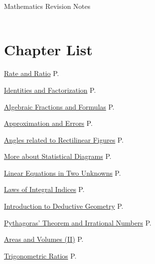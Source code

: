 \documentclass[12pt, a4paper]{article}
\begin{document}
\newpage
\newpage
\thispagestyle{empty}
\begin{center}
Mathematics Revision Notes\\\vspace{1cm}
\greybox{\fontsize{24pt}{24pt}\selectfont {S2 Chapters}} \\\vspace{1cm}
\end{center}
\vspace{0.5cm}
\hline
\section*{Chapter List}
\begin{enumx}[label=Ch \arabic*. , leftmargin=2cm,rightmargin=0pt,labelwidth=17mm, itemsep=3pt, topsep=3mm, labelsep=2mm, labelindent=0pt, align=left, partopsep=0mm ]
\item \hyperref[chapter:S2-1]{Rate and Ratio} \hfill P.\pageref{chapter:S2-1}
\item \hyperref[chapter:S2-2]{Identities and Factorization} \hfill P.\pageref{chapter:S2-2}
\item \hyperref[chapter:S2-3]{Algebraic Fractions and Formulas} \hfill P.\pageref{chapter:S2-3}
\item \hyperref[chapter:S2-4]{Approximation and Errors} \hfill P.\pageref{chapter:S2-4}
\item \hyperref[chapter:S2-5]{Angles related to Rectilinear Figures} \hfill P.\pageref{chapter:S2-5}
\item \hyperref[chapter:S2-6]{More about Statistical Diagrams} \hfill P.\pageref{chapter:S2-6}
\item \hyperref[chapter:S2-7]{Linear Equations in Two Unknowns} \hfill P.\pageref{chapter:S2-7}
\item \hyperref[chapter:S2-8]{Laws of Integral Indices} \hfill P.\pageref{chapter:S2-8}
\item \hyperref[chapter:S2-9]{Introduction to Deductive Geometry} \hfill P.\pageref{chapter:S2-9}
\item \hyperref[chapter:S2-10]{Pythagoras' Theorem and Irrational Numbers} \hfill P.\pageref{chapter:S2-10}
\item \hyperref[chapter:S2-11]{Areas and Volumes (II)} \hfill P.\pageref{chapter:S2-11}
\item \hyperref[chapter:S2-12]{Trigonometric Ratios} \hfill P.\pageref{chapter:S2-12}
\end{enumx}
\end{document}
